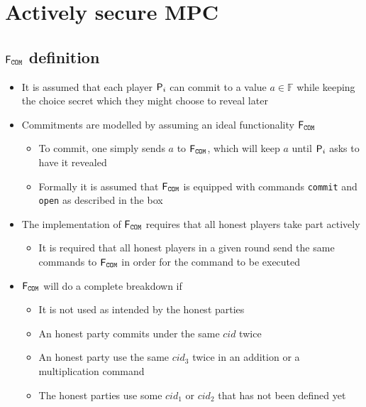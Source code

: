 \section{Actively secure MPC}

\subsection{$\F_{\COM}$ definition}
\begin{itemize}
  \item It is assumed that each player $\P_i$ can commit to a value $a \in \mathbb F$ while keeping the choice secret which they might choose to reveal later

  \item Commitments are modelled by assuming an ideal functionality $\FCOM$
  \begin{itemize}
  	\item To commit, one simply sends $a$ to $\FCOM$, which will keep $a$ until $\P_i$ asks to have it revealed
 		\item Formally it is assumed that $\FCOM$ is equipped with commands \texttt{commit} and \texttt{open} as described in the box
  \end{itemize}

	\item The implementation of $\FCOM$ requires that all honest players take part actively 
  \begin{itemize}
    \item It is required that all honest players in a given round send the same commands to $\FCOM$ in order for the command to be executed
  \end{itemize}

	\item $\FCOM$ will do a complete breakdown if
  \begin{itemize}
		\item It is not used as intended by the honest parties
		\item An honest party commits under the same $cid$ twice
		\item An honest party use the same $cid_3$ twice in an addition or a multiplication command
		\item The honest parties use some $cid_1$ or $cid_2$ that has not been defined yet
  \end{itemize}


\end{itemize}

